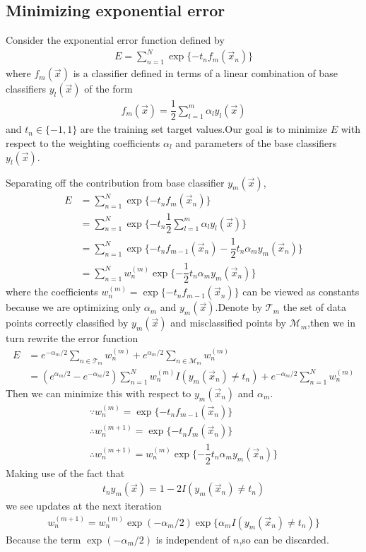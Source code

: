 \subsection{Minimizing exponential error}
Consider the exponential error function defined by
\begin{align}
E=\sum_{n=1}^{N}\exp\{-t_n f_m(\vec{x}_n)\}
\end{align}
where $f_m(\vec{x})$ is a classifier defined in terms of a linear combination of base classifiers $y_l(\vec{x})$ of the form
\begin{align}
f_m(\vec{x})=\dfrac{1}{2}\sum_{l=1}^{m}\alpha_l y_l(\vec{x})
\end{align}
and $t_n\in \{-1,1\}$ are the training set target values.Our goal is to minimize $E$ with respect to the weighting coefficients $\alpha_l$ and parameters of the base classifiers $y_l(\vec{x})$.

Separating off the contribution from base classifier $y_m(\vec{x})$,
\begin{align}
E&=\sum_{n=1}^{N}\exp\{-t_n f_m(\vec{x}_n)\} \\
&=\sum_{n=1}^{N}\exp\{-t_n \dfrac{1}{2}\sum_{l=1}^{m}\alpha_l y_l(\vec{x}) \} \\
&=\sum_{n=1}^{N}\exp\{-t_n f_{m-1}(\vec{x}_n)-\dfrac{1}{2}t_n \alpha_m y_m(\vec{x}_n)\} \\
&=\sum_{n=1}^{N}w_n^{(m)}\exp\{-\dfrac{1}{2}t_n \alpha_m y_m(\vec{x}_n)\}
\end{align}
where the coefficients $w_n^{(m)}=\exp\{-t_n f_{m-1}(\vec{x}_n)\}$ can be viewed as constants because we are optimizing only $\alpha_m$ and $y_m(\vec{x})$.Denote by $\mathcal{T}_m$ the set of data points correctly classified by $y_m(\vec{x})$ and misclassified points by $\mathcal{M}_m$,then we in turn rewrite the error function
\begin{align}
E &=e^{-\alpha_m/2}\sum_{n\in\mathcal{T}_m}w_n^{(m)}+e^{\alpha_m/2}\sum_{n\in\mathcal{M}_m}w_n^{(m)} \\
&=(e^{\alpha_m/2}-e^{-\alpha_m/2})\sum_{n=1}^{N}w_n^{(m)}I(y_m(\vec{x}_n)\neq t_n)+e^{-\alpha_m/2}\sum_{n=1}^{N}w_n^{(m)}
\end{align}
Then we can minimize this with respect to $y_m(\vec{x}_n)$ and $\alpha_m$.
\begin{align}
\because w_n^{(m)}=\exp\{-t_n f_{m-1}(\vec{x}_n)\} \\
\therefore w_n^{(m+1)}=\exp\{-t_n f_{m}(\vec{x}_n)\} \\
\therefore w_n^{(m+1)}=w_n^{(m)}\exp\{-\dfrac{1}{2}t_n\alpha_m y_m(\vec{x}_n)\}
\end{align}
Making use of the fact that
\begin{align}
t_n y_m(\vec{x})=1-2I(y_m(\vec{x}_n)\neq t_n)
\end{align}
we see updates at the next iteration
\begin{align}
w_n^{(m+1)}=w_n^{(m)}\exp(-\alpha_m/2)\exp\{\alpha_m I(y_m(\vec{x}_n)\neq t_n)\}
\end{align}
Because the term $\exp(-\alpha_m/2)$ is independent of $n$,so can be discarded.

